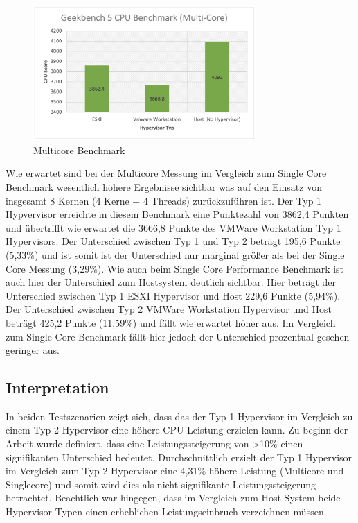 \documentclass[conference]{IEEEtran}
\begin{document}
\begin{figure}[!h]
	\centering
	\includegraphics[keepaspectratio,width=8.5cm,height=0.75\textheight]{multicore.png}
	\caption{Multicore Benchmark}
	\label{architecture}
\end{figure}

Wie erwartet sind bei der Multicore Messung im Vergleich zum Single Core Benchmark wesentlich höhere Ergebnisse sichtbar was auf den Einsatz von insgesamt 8 Kernen (4 Kerne + 4 Threads) zurückzuführen ist. Der Typ 1 Hypvervisor erreichte in diesem Benchmark eine Punktezahl von 3862,4 Punkten und übertrifft wie erwartet die 3666,8 Punkte des VMWare Workstation Typ 1 Hypervisors. Der Unterschied zwischen Typ 1 und Typ 2 beträgt 195,6 Punkte (5,33\%) und ist somit ist der Unterschied nur marginal größer als bei der Single Core Messung (3,29\%). Wie auch beim Single Core Performance Benchmark ist auch hier der Unterschied zum Hostsystem deutlich sichtbar. Hier beträgt der Unterschied zwischen Typ 1 ESXI Hypervisor und Host 229,6 Punkte (5,94\%). Der Unterschied zwischen Typ 2 VMWare Workstation Hypervisor und Host beträgt 425,2 Punkte (11,59\%) und fällt wie erwartet höher aus. Im Vergleich zum Single Core Benchmark fällt hier jedoch der Unterschied prozentual gesehen geringer aus.


\subsection{Interpretation}
In beiden Testszenarien zeigt sich, dass das der Typ 1 Hypervisor im Vergleich zu einem Typ 2 Hypervisor eine höhere CPU-Leistung erzielen kann. Zu beginn der Arbeit wurde definiert, dass eine Leistungssteigerung von >10\% einen signifikanten Unterschied bedeutet. Durchschnittlich erzielt der Typ 1 Hypervisor im Vergleich zum Typ 2 Hypervisor eine 4,31\% höhere Leistung (Multicore und Singlecore) und somit wird dies als nicht signifikante Leistungssteigerung betrachtet.
Beachtlich war hingegen, dass im Vergleich zum Host System beide Hypervisor Typen einen erheblichen Leistungseinbruch verzeichnen müssen.
\end{document}
